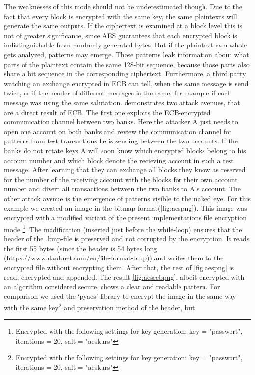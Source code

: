 The weaknesses of this mode
should not be underestimated though. Due to the fact that every block is
encrypted with the same key, the same plaintexts will generate the same
outputs. If the ciphertext is examined at a block level this is not of
greater significance, since AES guarantees that each encrypted block is
indistinguishable from randomly generated bytes. But if the plaintext as
a whole gets analyzed, patterns may emerge. Those patterns leak
information about what parts of the plaintext contain the same 128-bit
sequence, because those parts also share a bit sequence in
the corresponding ciphertext. Furthermore, a third party watching an
exchange encrypted in ECB can tell, when the same
message is send twice, or if the header of different messages is the
same, for example if each message was using the same salutation. \cite{paar}
demonstrates two attack avenues, that are a direct result of ECB. The
first one exploits the ECB-encrypted communication channel between two
banks. Here the attacker A just needs to open one account on both banks
and review the communication channel for patterns from test transactions
he is sending between the two accounts. If the banks do not rotate keys
A will soon know which encrypted blocks belong to his account number and
which block denote the recieving account in such a test message. After learning that they can
exchange all blocks they know as reserved for the number of the
receiving account with the blocks for their own account number and
divert all transactions between the two banks to A's account. The other
attack avenue is the emergence of patterns visible to the naked eye. For
this example we created an image in the bitmap format(\ref{fig:aespng}). This
image was encrypted with a modified variant of the present
implementations file encryption mode \footnote{Encrypted with the following settings for key generation: key = "passwort", iterations = 20, salt = "aeskurs"}. The modification (inserted just
before the while-loop) ensures that the header of the .bmp-file is
preserved and not corrupted by the encryption. It reads the first 55
bytes (since the header is 54 bytes long
(https://www.daubnet.com/en/file-format-bmp)) and writes them to the
encrypted file without encrypting them. After that, the rest of \ref{fig:aespng}
is read, encrypted and appended. The result \ref{fig:aesecbpng}, albeit encrypted
with an algorithm considered secure, shows a clear and readable pattern.
For comparison we used the `pyaes'-library to encrypt the image in the
same way with the same key\footnote{Encrypted with the following settings for key generation: key = "passwort", iterations = 20, salt = "aeskurs"} and preservation method of the header, but
